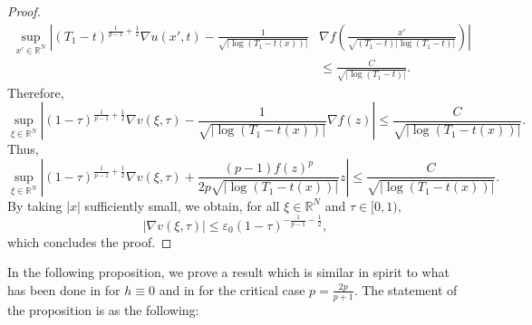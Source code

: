 \documentclass[11pt,a4paper]{article}
\newcommand{\1}{\mathbbm{1}}
\numberwithin{equation}{section}
\newcommand{\numberset}{\mathbb}
\newcommand{\R}{\numberset{R}}
\theoremstyle{remark}
\begin{document}
\begin{proof}
\begin{equation*}
\begin{split}
\underset{x'\in \R^N}{\sup}\left|(T_1-t)^{\frac{1}{p-1}+\frac{1}{2}}\nabla u(x',t)-\frac{1}{\sqrt{|\log(T_1-t(x))|}}\right.&\left.\nabla f\left(\frac{x'}{\sqrt{(T_1-t)|\log(T_1-t)|}}\right)\right|\\
&\leq \frac{C}{\sqrt{|\log(T_1-t)|}}.
\end{split}
\end{equation*}
Therefore,
\begin{equation*}
\underset{\xi\in \R^N}{\sup}\left|(1-\tau)^{\frac{1}{p-1}+\frac{1}{2}}\nabla v(\xi,\tau)-\frac{1}{\sqrt{|\log(T_1-t(x))|}}\nabla f\left(z\right)\right|\leq \frac{C}{\sqrt{|\log(T_1-t(x))|}}.
\end{equation*}
Thus,
\begin{equation*}
\underset{\xi\in \R^N}{\sup}\left|(1-\tau)^{\frac{1}{p-1}+\frac{1}{2}}\nabla v(\xi,\tau)+\frac{(p-1)f\left(z\right)^p}{2p\sqrt{|\log(T_1-t(x))|}} z\right|\leq \frac{C}{\sqrt{|\log(T_1-t(x))|}}.
\end{equation*}
By taking $|x|$ sufficiently small, we obtain, for all $\xi\in \R^N$ and $\tau \in [0,1)$,
\begin{equation}\label{rough bound grad v}
|\nabla v(\xi,\tau)|\leq \varepsilon_0 (1-\tau)^{-\frac{1}{p-1}-\frac{1}{2}},
\end{equation}
which concludes the proof.
\end{proof}


In the following proposition, we prove a result which is similar in spirit to what has been done in \cite{GK1989} for $h\equiv0$ and in \cite{TZ2015} for the critical case $p=\frac{2p}{p+1}$. The statement of the proposition is as the following:
\end{document}
